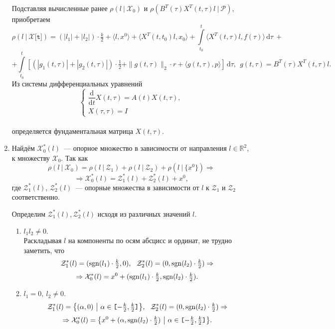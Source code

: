 \documentclass[a4paper,11pt]{article}
\begin{document}
\begin{enumerate}
Подставляя вычисленные ранее $ \rho{(l \ | \ \mathcal{X}_0)}$ и $ \rho{(B^{T}(\tau)X^{T}(t, \tau)l \ | \  \mathcal{P})}$, приобретаем
\[ \rho{(l \ | \ \mathcal{X}\texttt{[t]})} = (|l_1| + |l_2|) \cdot \tfrac{k}{2} + \langle l, x^0 \rangle + \langle X^{T}(t, t_0)l, x_0 \rangle + \int\limits_{t_0}^{t}{ \langle X^{T}(t, \tau)l, f(\tau) \rangle} \, \mathrm{d}\tau \ + \]
\[ + \int\limits_{t_0}^{t}{ \left[  (|g_1(t, \tau)| + |g_2(t, \tau)|) \cdot \tfrac{1}{2} + \|g(t, \tau)\|_2 \cdot r + \langle g(t, \tau), p \rangle \right] \, \mathrm{d}\tau}, \ \ \text{$g(t, \tau) = B^{T}(\tau)X^{T}(t, \tau)l$}. \]
Из системы дифференциальных уравнений \\
$$\begin{cases}
\dfrac{\mathrm{d}}{\mathrm{d}t}X(t, \tau) = A(t)X(t, \tau), \\
X(\tau, \tau) = I
\end{cases}$$ \\
определяется фундаментальная матрица $X(t, \tau)$.

\item Найдём $\mathcal{X}_0^{*}(l)$~--- опорное множество в зависимости от направления $l \in \mathbb{R}^{2}$, к множеству $\mathcal{X}_0$. Так как
\[ \rho{(l \ | \ \mathcal{X}_0)} = \rho{(l \ | \ \mathcal{Z}_1)} + \rho{(l \ | \ \mathcal{Z}_2)} + \rho{(l \ | \ \{x^0\})} \Rightarrow \]
\[ \Rightarrow \mathcal{X}_0^{*}(l) = \mathcal{Z}_1^{*}(l) + \mathcal{Z}_2^{*}(l) + x^0, \]
где $\mathcal{Z}_1^{*}(l)$, $\mathcal{Z}_2^{*}(l)$~--- опорные множества в зависимости от $l$ к $\mathcal{Z}_1$ и $\mathcal{Z}_2$ соответственно.
 
Определим $\mathcal{Z}_1^{*}(l), \mathcal{Z}_2^{*}(l)$ исходя из различных значений $l$.
\begin{enumerate}
\item $l_1 l_2 \neq 0$.\\
Раскладывая $l$ на компоненты по осям абсцисс и ординат, не трудно заметить, что 
\[ \mathcal{Z}_1^{*}(l) =  (\mathrm{sgn}(l_1) \cdot \tfrac{k}{2}, 0) , \ \  \mathcal{Z}_2^{*}(l) = (0, \mathrm{sgn}(l_2) \cdot \tfrac{k}{2}) \Rightarrow \]
\[ \Rightarrow \mathcal{X}_0^{*}(l) = x^0 + (\mathrm{sgn}(l_1) \cdot \tfrac{k}{2}, \mathrm{sgn}(l_2) \cdot \tfrac{k}{2}). \]

\item $l_1 = 0, \ l_2 \neq 0$. 
\[ \mathcal{Z}_1^{*}(l) = \big{\{} (\alpha,0) \ \big{|} \  \alpha \in \texttt{[$-\tfrac{k}{2},\tfrac{k}{2}$]} \big{\}}, \ \  \mathcal{Z}_2^{*}(l) = (0, \mathrm{sgn}(l_2) \cdot \tfrac{k}{2}) \Rightarrow \]
\[ \Rightarrow \mathcal{X}_0^{*}(l) = \big{\{} x^0 + (\alpha, \mathrm{sgn}(l_2) \cdot \tfrac{k}{2}) \  \big{|} \ \alpha \in \texttt{[$-\tfrac{k}{2},\tfrac{k}{2}$]} \big{\}} . \]


\end{enumerate}
\end{enumerate}
\end{document}
